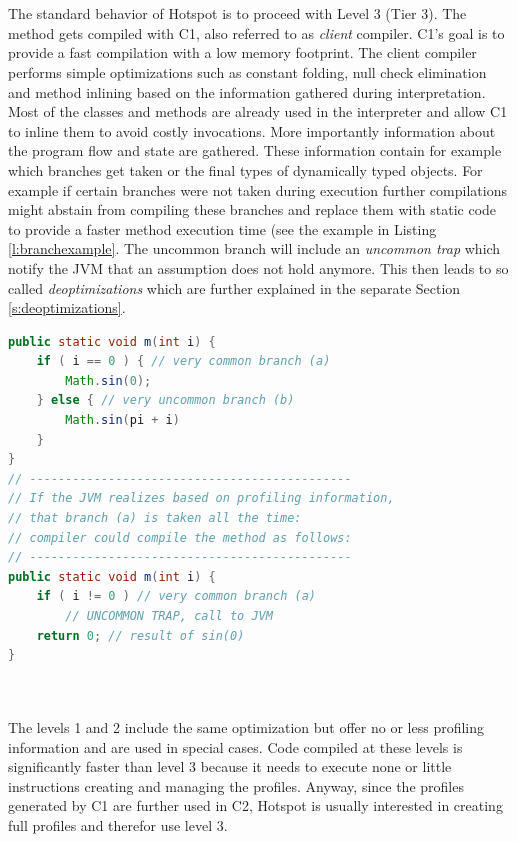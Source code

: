 \\\\
The standard behavior of Hotspot is to proceed with Level 3 (Tier 3). The method gets compiled with C1, also referred to as \textit{client} compiler.
C1's goal is to provide a fast compilation with a low memory footprint.
The client compiler performs simple optimizations such as constant folding, null check elimination and method inlining based on the information gathered during interpretation. 
Most of the classes and methods are already used in the interpreter and allow C1 to inline them to avoid costly invocations.
More importantly information about the program flow and state are gathered. These information contain for example which branches get taken or the final types of dynamically typed objects. 
For example if certain branches were not taken during execution further compilations might abstain from compiling these branches and replace them with static code to provide a faster method execution time (see the example in Listing \ref{l:branchexample}. The uncommon branch will include an \textit{uncommon trap} which notify the JVM that an assumption does not hold anymore. This then leads to so called \textit{deoptimizations} which are further explained in the separate Section \ref{s:deoptimizations}.
\begin{lstlisting}[float,caption=Example that show potential compilation based on profiling information,label=l:branchexample,language=Java]
public static void m(int i) {
    if ( i == 0 ) { // very common branch (a)
        Math.sin(0);
    } else { // very uncommon branch (b)
        Math.sin(pi + i)
    }
}
// ---------------------------------------------
// If the JVM realizes based on profiling information,
// that branch (a) is taken all the time:
// compiler could compile the method as follows:
// ---------------------------------------------
public static void m(int i) {
    if ( i != 0 ) // very common branch (a)
        // UNCOMMON TRAP, call to JVM
    return 0; // result of sin(0)
}
\end{lstlisting}
\\\\
The levels 1 and 2 include the same optimization but offer no or less profiling information and are used in special cases. Code compiled at these levels is significantly faster than level 3 because it needs to execute none or little instructions creating and managing the profiles. Anyway, since the profiles generated by C1 are further used in C2, Hotspot is usually interested in creating full profiles and therefor use level 3.
